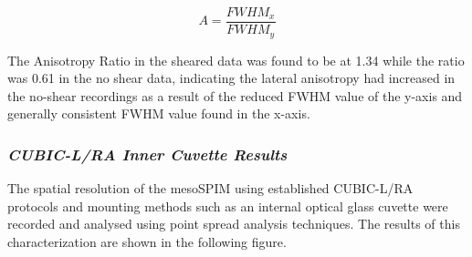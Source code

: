 \begin{equation}
A = \frac{FWHM_x}{FWHM_y}
\end{equation}
\medskip

The Anisotropy Ratio in the sheared data was found to be at 1.34 while the ratio was 0.61 in the no shear data, indicating the lateral anisotropy had increased in the no-shear recordings as a result of the reduced FWHM value of the y-axis and generally consistent FWHM value found in the x-axis. 

\subsubsection{\textit{CUBIC-L/RA Inner Cuvette Results}}
The spatial resolution of the mesoSPIM using established CUBIC-L/RA protocols and mounting methods such as an internal optical glass cuvette were recorded and analysed using point spread analysis techniques. The results of this characterization are shown in the following figure.

